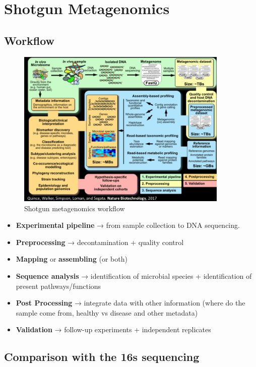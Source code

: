 \graphicspath{{chapters/images/08/}}

\chapter{Shotgun Metagenomics}

\section{Workflow}

\begin{figure}[!h]
\centering
\includegraphics[width=0.9\textwidth]{Shotgun_workflow.png}
\caption{\label{fig:workflow}Shotgun metagenomics workflow}
\end{figure}

\begin{itemize}
\item \textbf{Experimental pipeline} → from sample collection to DNA sequencing.
\item \textbf{Preprocessing} → decontamination + quality control
\item \textbf{Mapping} or \textbf{assembling} (or both)
\item \textbf{Sequence analysis} → identification of microbial species + identification of present pathways/functions
\item \textbf{Post Processing} → integrate data with other information (where do the sample come from, healthy vs disease and other metadata)
\item \textbf{Validation} → follow-up experiments + independent replicates
\end{itemize}

\section{Comparison with the 16s sequencing}

